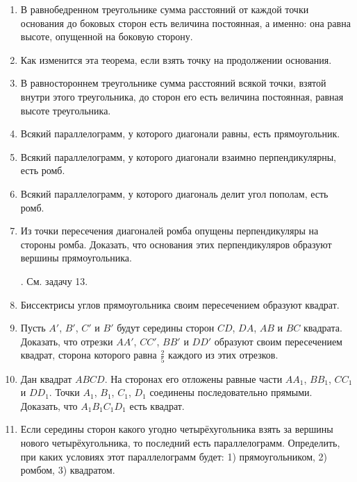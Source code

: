 \documentclass[oneside]{book}
\begin{document}
\begin{enumerate}
 \item
В равнобедренном треугольнике сумма расстояний от каждой точки основания до боковых сторон есть величина постоянная, а именно:
она равна высоте, опущенной на боковую сторону.

 \item
Как изменится эта теорема, если взять точку на продолжении основания.

 \item
В равностороннем треугольнике сумма расстояний всякой точки, взятой внутри этого треугольника, до сторон его есть величина постоянная, равная высоте треугольника.

 \item
Всякий параллелограмм, у которого диагонали равны, есть прямоугольник.

 \item
Всякий параллелограмм, у которого диагонали взаимно перпендикулярны, есть ромб.

 \item
Всякий параллелограмм, у которого диагональ делит угол пополам, есть ромб.

 \item
Из точки пересечения диагоналей ромба опущены перпендикуляры на стороны ромба.
Доказать, что основания этих перпендикуляров образуют вершины прямоугольника.

\smallskip
{}.
См.
задачу 13.

 \item
Биссектрисы углов прямоугольника своим пересечением образуют квадрат.

 \item
Пусть $A'$, $B'$, $C'$ и $B'$ будут середины сторон $CD$, $DA$, $AB$ и $BC$ квадрата.
Доказать, что отрезки $AA'$, $CC'$, $BB'$ и $DD'$ образуют своим пересечением квадрат, сторона которого равна $\tfrac25$ каждого из этих отрезков.

 \item
Дан квадрат $ABCD$.
На сторонах его отложены равные части $AA_1$, $BB_1$, $CC_1$ и $DD_1$.
Точки $A_1$, $B_1$, $C_1$, $D_1$ соединены последовательно прямыми.
Доказать, что $A_1B_1C_1D_1$ есть квадрат.

 \item
Если середины сторон какого угодно четырёхугольника взять за вершины нового четырёхугольника, то последний есть параллелограмм.
Определить, при каких условиях этот параллелограмм будет:
1) прямоугольником, 2) ромбом, 3) квадратом.

\end{enumerate}
\end{document}
